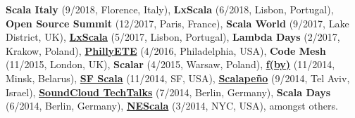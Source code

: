\documentclass[9pt]{article}
\begin{document}
{}
\medskip
\newline\noindent
{\bf Scala Italy} (9/2018, Florence, Italy),
{\bf LxScala} (6/2018, Lisbon, Portugal),
{\bf Open Source Summit} (12/2017, Paris, France),
{\bf Scala World} (9/2017, Lake District, UK),
{\bf \href{https://youtu.be/17yy5BwIiTw}{LxScala}} (5/2017, Lisbon, Portugal),
{\bf Lambda Days} (2/2017, Krakow, Poland),
{\bf\href{https://www.youtube.com/watch?v=67UNErFdr64}{PhillyETE}} (4/2016, Philadelphia, USA),
{\bf Code Mesh} (11/2015, London, UK),
{\bf Scalar} (4/2015, Warsaw, Poland),
{\bf\href{http://fby.by/}{f(by)}} (11/2014, Minsk, Belarus),
{\bf\href{https://www.youtube.com/watch?v=4obTnLVXQWY}{SF Scala}} (11/2014, SF, USA),
{\bf\href{http://www.scalapeno.org.il/#!heather-miller/cj0q}{Scalape\~{n}o}} (9/2014, Tel Aviv, Israel),
{\bf \href{https://www.eventbrite.com/e/soundcloud-techtalks-unconventional-thinking-in-design-and-programming-tickets-12166429117}{SoundCloud TechTalks}} (7/2014, Berlin, Germany),
{\bf Scala Days} (6/2014, Berlin, Germany),
{\bf\href{http://www.nescala.org/2014}{NEScala}} (3/2014, NYC, USA), amongst others.

\bigskip




\end{document}
